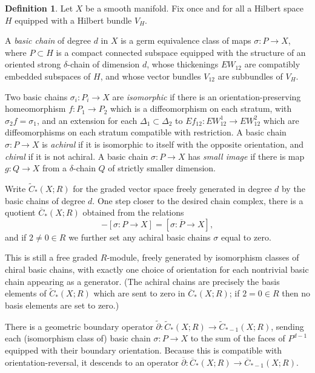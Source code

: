 \documentclass{memo-l}
\theoremstyle{definition}
\newtheorem{definition}[theorem]{Definition}
\theoremstyle{remark}
\numberwithin{section}{chapter}
\numberwithin{equation}{chapter}
\begin{document}
\begin{definition}\label{basicchain}Let $X$ be a smooth manifold. Fix once and for all a Hilbert space $H$ equipped with a Hilbert bundle $V_H$.

A \emph{basic chain} of degree $d$ in $X$ is a germ equivalence class of maps $\sigma: P \to X$, where $P\subset H$ is a compact connected subspace equipped with the structure of an oriented strong $\delta$-chain of dimension $d$, whose thickenings $EW_{12}$ are compatibly embedded subspaces of $H$, and whose vector bundles $V_{12}$ are subbundles of $V_H$. 

Two basic chains $\sigma_i: P_i \to X$ are \emph{isomorphic} if there is an orientation-preserving homeomorphism $f: P_1 \to P_2$ which is a diffeomorphism on each stratum, with $\sigma_2f = \sigma_1$, and an extension for each $\Delta_1 \subset \Delta_2$ to $Ef_{12}: EW_{12}^1 \to EW_{12}^2$ which are diffeomorphisms on each stratum compatible with restriction. 
A basic chain $\sigma: P \to X$ is \emph{achiral} if it is isomorphic to itself with the opposite orientation, and \emph{chiral} if it is not achiral. A basic chain $\sigma: P \to X$ has \emph{small image} if there is map $g: Q \to X$ from a $\delta$-chain $Q$ of strictly smaller dimension.
\end{definition}

Write $\widetilde C_*(X;R)$ for the graded vector space freely generated in degree $d$ by the basic chains of degree $d$. One step closer to the desired chain complex, there is a quotient $\overline C_*(X;R)$ obtained from the relations
$$- [\sigma: P \to X] = [\sigma: \overline P \to X],$$
and if $2 \neq 0 \in R$ we further set any achiral basic chains $\sigma$ equal to zero.

This is still a free graded $R$-module, freely generated by isomorphism classes of chiral basic chains, with exactly one choice of orientation for each nontrivial basic chain appearing as a generator. (The achiral chains are precisely the basis elements of $\widetilde C_*(X;R)$ which are sent to zero in $\overline C_*(X;R)$; if $2 = 0 \in R$ then no basis elements are set to zero.)

There is a geometric boundary operator $\widetilde\partial: \widetilde C_*(X;R) \to \widetilde C_{*-1}(X;R)$, sending each (isomorphism class of) basic chain $\sigma: P \to X$ to the sum of the faces of $P^{d-1}$ equipped with their boundary orientation. Because this is compatible with orientation-reversal, it descends to an operator $\overline \partial: \overline C_*(X;R) \to \overline C_{*-1}(X;R)$. 
\end{document}
